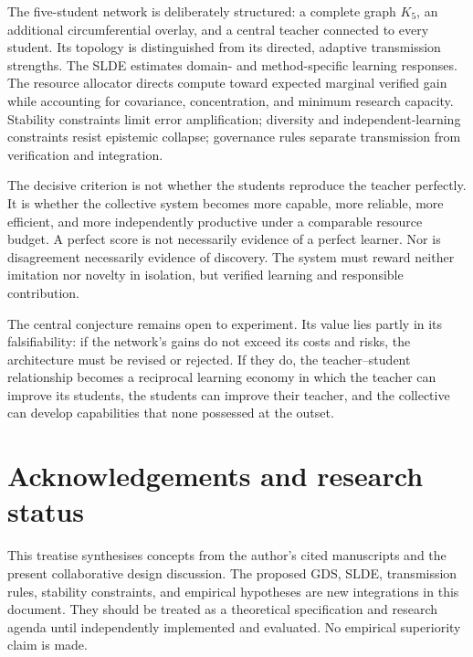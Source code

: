 \documentclass[11pt,a4paper]{article}
\begin{document}
The five-student network is deliberately structured: a complete graph \(K_5\), an additional circumferential overlay, and a central teacher connected to every student. Its topology is distinguished from its directed, adaptive transmission strengths. The SLDE estimates domain- and method-specific learning responses. The resource allocator directs compute toward expected marginal verified gain while accounting for covariance, concentration, and minimum research capacity. Stability constraints limit error amplification; diversity and independent-learning constraints resist epistemic collapse; governance rules separate transmission from verification and integration.

The decisive criterion is not whether the students reproduce the teacher perfectly. It is whether the collective system becomes more capable, more reliable, more efficient, and more independently productive under a comparable resource budget. A perfect score is not necessarily evidence of a perfect learner. Nor is disagreement necessarily evidence of discovery. The system must reward neither imitation nor novelty in isolation, but verified learning and responsible contribution.

The central conjecture remains open to experiment. Its value lies partly in its falsifiability: if the network's gains do not exceed its costs and risks, the architecture must be revised or rejected. If they do, the teacher--student relationship becomes a reciprocal learning economy in which the teacher can improve its students, the students can improve their teacher, and the collective can develop capabilities that none possessed at the outset.

\section*{Acknowledgements and research status}

This treatise synthesises concepts from the author's cited manuscripts and the present collaborative design discussion. The proposed GDS, SLDE, transmission rules, stability constraints, and empirical hypotheses are new integrations in this document. They should be treated as a theoretical specification and research agenda until independently implemented and evaluated. No empirical superiority claim is made.
\end{document}
